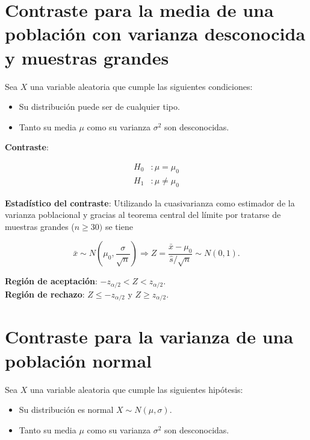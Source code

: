 \documentclass[
  spanish,
  a4paper,
]{scrreport}
\providecommand{\tightlist}{%
  \setlength{\itemsep}{0pt}\setlength{\parskip}{0pt}}
\theoremstyle{plain}
\theoremstyle{definition}
\theoremstyle{definition}
\theoremstyle{remark}
\begin{document}
\section{Contraste para la media de una población con varianza
desconocida y muestras
grandes}\label{contraste-para-la-media-de-una-poblaciuxf3n-con-varianza-desconocida-y-muestras-grandes}

Sea \(X\) una variable aleatoria que cumple las siguientes condiciones:

\begin{itemize}
\tightlist
\item
  Su distribución puede ser de cualquier tipo.
\item
  Tanto su media \(\mu\) como su varianza \(\sigma^2\) son desconocidas.
\end{itemize}

\textbf{Contraste}:

\begin{align*}
H_0 &: \mu=\mu_0 \\
H_1 &: \mu\neq \mu_0
\end{align*}

\textbf{Estadístico del contraste}: Utilizando la cuasivarianza como
estimador de la varianza poblacional y gracias al teorema central del
límite por tratarse de muestras grandes (\(n\geq 30)\) se tiene

\[
\bar x\sim N\left(\mu_0,\frac{\sigma}{\sqrt{n}}\right) \Rightarrow Z=\frac{\bar x-\mu_0}{\hat s/\sqrt{n}}\sim N(0,1).
\]

\textbf{Región de aceptación}: \(-z_{\alpha/2}< Z < z_{\alpha/2}\).\\
\textbf{Región de rechazo}: \(Z\leq -z_{\alpha/2}\) y
\(Z\geq z_{\alpha/2}\).

\section{Contraste para la varianza de una población
normal}\label{contraste-para-la-varianza-de-una-poblaciuxf3n-normal}

Sea \(X\) una variable aleatoria que cumple las siguientes hipótesis:

\begin{itemize}
\tightlist
\item
  Su distribución es normal \(X\sim N(\mu,\sigma)\).
\item
  Tanto su media \(\mu\) como su varianza \(\sigma^2\) son desconocidas.
\end{itemize}
\end{document}
